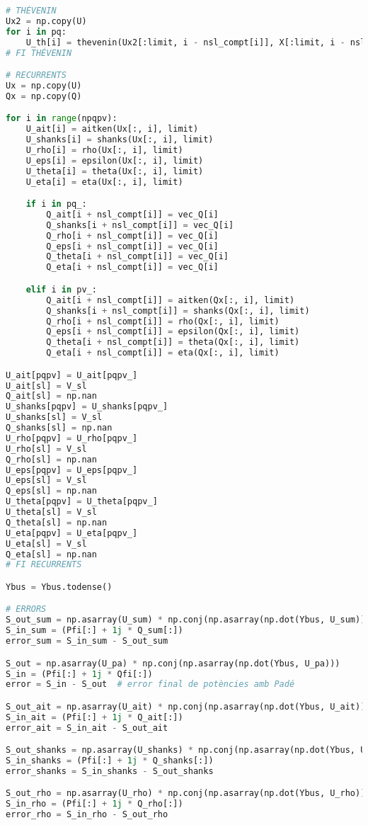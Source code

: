 \begin{lstlisting}[language=Python,numbers=none]
# THÉVENIN
Ux2 = np.copy(U)
for i in pq:
    U_th[i] = thevenin(Ux2[:limit, i - nsl_compt[i]], X[:limit, i - nsl_compt[i]])
# FI THÉVENIN

# RECURRENTS
Ux = np.copy(U)
Qx = np.copy(Q)

for i in range(npqpv):
    U_ait[i] = aitken(Ux[:, i], limit)
    U_shanks[i] = shanks(Ux[:, i], limit)
    U_rho[i] = rho(Ux[:, i], limit)
    U_eps[i] = epsilon(Ux[:, i], limit)
    U_theta[i] = theta(Ux[:, i], limit)
    U_eta[i] = eta(Ux[:, i], limit)

    if i in pq_:
        Q_ait[i + nsl_compt[i]] = vec_Q[i]
        Q_shanks[i + nsl_compt[i]] = vec_Q[i]
        Q_rho[i + nsl_compt[i]] = vec_Q[i]
        Q_eps[i + nsl_compt[i]] = vec_Q[i]
        Q_theta[i + nsl_compt[i]] = vec_Q[i]
        Q_eta[i + nsl_compt[i]] = vec_Q[i]

    elif i in pv_:
        Q_ait[i + nsl_compt[i]] = aitken(Qx[:, i], limit)
        Q_shanks[i + nsl_compt[i]] = shanks(Qx[:, i], limit)
        Q_rho[i + nsl_compt[i]] = rho(Qx[:, i], limit)
        Q_eps[i + nsl_compt[i]] = epsilon(Qx[:, i], limit)
        Q_theta[i + nsl_compt[i]] = theta(Qx[:, i], limit)
        Q_eta[i + nsl_compt[i]] = eta(Qx[:, i], limit)

U_ait[pqpv] = U_ait[pqpv_]
U_ait[sl] = V_sl
Q_ait[sl] = np.nan
U_shanks[pqpv] = U_shanks[pqpv_]
U_shanks[sl] = V_sl
Q_shanks[sl] = np.nan
U_rho[pqpv] = U_rho[pqpv_]
U_rho[sl] = V_sl
Q_rho[sl] = np.nan
U_eps[pqpv] = U_eps[pqpv_]
U_eps[sl] = V_sl
Q_eps[sl] = np.nan
U_theta[pqpv] = U_theta[pqpv_]
U_theta[sl] = V_sl
Q_theta[sl] = np.nan
U_eta[pqpv] = U_eta[pqpv_]
U_eta[sl] = V_sl
Q_eta[sl] = np.nan
# FI RECURRENTS

Ybus = Ybus.todense()

# ERRORS
S_out_sum = np.asarray(U_sum) * np.conj(np.asarray(np.dot(Ybus, U_sum)))
S_in_sum = (Pfi[:] + 1j * Q_sum[:])
error_sum = S_in_sum - S_out_sum

S_out = np.asarray(U_pa) * np.conj(np.asarray(np.dot(Ybus, U_pa)))
S_in = (Pfi[:] + 1j * Qfi[:])
error = S_in - S_out  # error final de potències amb Padé

S_out_ait = np.asarray(U_ait) * np.conj(np.asarray(np.dot(Ybus, U_ait)))
S_in_ait = (Pfi[:] + 1j * Q_ait[:])
error_ait = S_in_ait - S_out_ait

S_out_shanks = np.asarray(U_shanks) * np.conj(np.asarray(np.dot(Ybus, U_shanks)))
S_in_shanks = (Pfi[:] + 1j * Q_shanks[:])
error_shanks = S_in_shanks - S_out_shanks

S_out_rho = np.asarray(U_rho) * np.conj(np.asarray(np.dot(Ybus, U_rho)))
S_in_rho = (Pfi[:] + 1j * Q_rho[:])
error_rho = S_in_rho - S_out_rho


\end{lstlisting}
